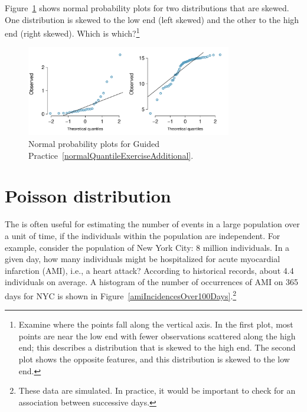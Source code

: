 \begin{exercise} \label{normalQuantileExerciseAdditional}
Figure~\ref{normalQuantileExerAdditional} shows normal probability plots for two distributions that are skewed. One distribution is skewed to the low end (left skewed) and the other to the high end (right skewed). Which is which?\footnote{Examine where the points fall along the vertical axis. In the first plot, most points are near the low end with fewer observations scattered along the high end; this describes a distribution that is skewed to the high end. The second plot shows the opposite features, and this distribution is skewed to the low end.}
\end{exercise}

\begin{figure}[h!]
\centering
\includegraphics[width=0.80\textwidth]{ch_distributions_oi_biostat/figures/normalQuantileExer/normalQuantileExerAdditional}
\caption{Normal probability plots for Guided Practice~\ref{normalQuantileExerciseAdditional}.}
\label{normalQuantileExerAdditional}
\end{figure}







\newpage


\section{Poisson distribution}
\label{poisson}


The  is often useful for estimating the number of events in a large population over a unit of time, if the individuals within the population are independent. For example, consider the population of New York City: 8 million individuals. In a given day, how many individuals might be hospitalized for acute myocardial infarction (AMI), i.e., a heart attack? According to historical records, about 4.4 individuals on average. A histogram of the number of occurrences of AMI on 365 days for NYC is shown in Figure~\ref{amiIncidencesOver100Days}.\footnote{These data are simulated. In practice, it would be important to check for an association between successive days.}

